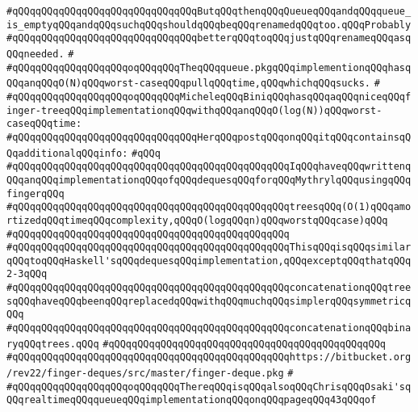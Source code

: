 \verb|#qQQqqQQqqQQqqQQqqQQqqQQqqQQqqQQqButqQQqthenqQQqQueueqQQqandqQQqqueue_is_emptyqQQqandqQQqsuchqQQqshouldqQQqbeqQQqrenamedqQQqtoo.qQQqProbably|\newline
\verb|#qQQqqQQqqQQqqQQqqQQqqQQqqQQqqQQqbetterqQQqtoqQQqjustqQQqrenameqQQqasqQQqneeded.|\newline
\verb|#|\newline
\verb|#qQQqqQQqqQQqqQQqqQQqoqQQqqQQqTheqQQqqueue.pkgqQQqimplementionqQQqhasqQQqanqQQqO(N)qQQqworst-caseqQQqpullqQQqtime,qQQqwhichqQQqsucks.|\newline
\verb|#|\newline
\verb|#qQQqqQQqqQQqqQQqqQQqoqQQqqQQqMicheleqQQqBiniqQQqhasqQQqaqQQqniceqQQqfinger-treeqQQqimplementationqQQqwithqQQqanqQQqO(log(N))qQQqworst-caseqQQqtime:|\newline
\verb|#qQQqqQQqqQQqqQQqqQQqqQQqqQQqqQQqHerqQQqpostqQQqonqQQqitqQQqcontainsqQQqadditionalqQQqinfo:|\newline
\verb|#qQQq|\newline
\verb|#qQQqqQQqqQQqqQQqqQQqqQQqqQQqqQQqqQQqqQQqqQQqqQQqIqQQqhaveqQQqwrittenqQQqanqQQqimplementationqQQqofqQQqdequesqQQqforqQQqMythrylqQQqusingqQQqfingerqQQq|\newline
\verb|#qQQqqQQqqQQqqQQqqQQqqQQqqQQqqQQqqQQqqQQqqQQqqQQqtreesqQQq(O(1)qQQqamortizedqQQqtimeqQQqcomplexity,qQQqO(logqQQqn)qQQqworstqQQqcase)qQQq|\newline
\verb|#qQQqqQQqqQQqqQQqqQQqqQQqqQQqqQQqqQQqqQQqqQQqqQQq|\newline
\verb|#qQQqqQQqqQQqqQQqqQQqqQQqqQQqqQQqqQQqqQQqqQQqqQQqThisqQQqisqQQqsimilarqQQqtoqQQqHaskell'sqQQqdequesqQQqimplementation,qQQqexceptqQQqthatqQQq2-3qQQq|\newline
\verb|#qQQqqQQqqQQqqQQqqQQqqQQqqQQqqQQqqQQqqQQqqQQqqQQqconcatenationqQQqtreesqQQqhaveqQQqbeenqQQqreplacedqQQqwithqQQqmuchqQQqsimplerqQQqsymmetricqQQq|\newline
\verb|#qQQqqQQqqQQqqQQqqQQqqQQqqQQqqQQqqQQqqQQqqQQqqQQqconcatenationqQQqbinaryqQQqtrees.qQQq|\newline
\verb|#qQQqqQQqqQQqqQQqqQQqqQQqqQQqqQQqqQQqqQQqqQQqqQQq|\newline
\verb|#qQQqqQQqqQQqqQQqqQQqqQQqqQQqqQQqqQQqqQQqqQQqqQQqhttps://bitbucket.org/rev22/finger-deques/src/master/finger-deque.pkg|\newline
\verb|#|\newline
\verb|#qQQqqQQqqQQqqQQqqQQqoqQQqqQQqThereqQQqisqQQqalsoqQQqChrisqQQqOsaki'sqQQqrealtimeqQQqqueueqQQqimplementationqQQqonqQQqpageqQQq43qQQqof|\newline
